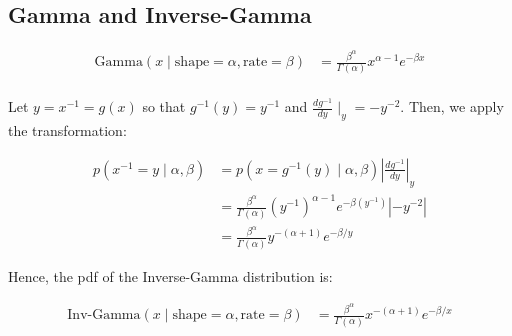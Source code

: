 \documentclass{article}
\providecommand{\nv}{{}^{-1}}
\begin{document}
\begin{flushleft}

\section{Gamma and Inverse-Gamma}

\begin{align*}
\text{Gamma}(x \mid \text{shape} = \alpha, \text{rate} = \beta) &= \frac{\beta^\alpha}{\Gamma(\alpha)} x^{\alpha - 1} e^{- \beta x} \\
\end{align*}

Let $y = x \nv = g(x)$ so that $g \nv (y) = y \nv $ and $\frac{d g \nv}{d y} \mid_y  = - y^{-2}$. Then, we apply the transformation:

\begin{align*}
p( x \nv = y \mid  \alpha, \beta) &= p(x = g \nv (y) \mid \alpha, \beta) \left | \frac{d g \nv}{d y} \right |_y \\
&= \frac{\beta^\alpha}{\Gamma(\alpha)} (y \nv)^{\alpha - 1} e^{- \beta (y \nv)} |- y^{-2}| \\
&= \frac{\beta^\alpha}{\Gamma(\alpha)} y ^{-(\alpha + 1)} e^{- \beta/y}
\end{align*}

Hence, the pdf of the Inverse-Gamma distribution is:

\begin{align*}
\text{Inv-Gamma}(x \mid \text{shape} = \alpha, \text{rate} = \beta) &= \frac{\beta^\alpha}{\Gamma(\alpha)} x^{-(\alpha + 1)} e^{- \beta / x}
\end{align*}

\end{flushleft}
\end{document}
